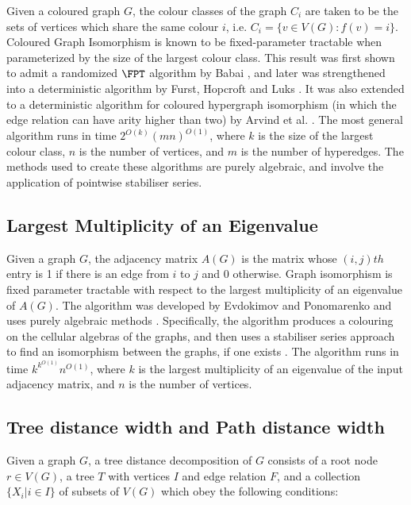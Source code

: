 \documentclass[11pt]{report}
\begin{document}
Given a coloured graph $G$, the colour classes of the graph $C_i$ are taken to be the sets of vertices which share the same colour $i$, i.e. $C_i = \{v\in V(G): f(v)=i\}$. Coloured Graph Isomorphism is known to be fixed-parameter tractable when parameterized by the size of the largest colour class. This result was first shown to admit a randomized $\FPT$ algorithm by Babai \cite{Babai79}, and later was strengthened into a deterministic algorithm by Furst, Hopcroft and Luks \cite{FurstHopcroftLuks80}. It was also extended to a deterministic algorithm for coloured hypergraph isomorphism (in which the edge relation can have arity higher than two) by Arvind et al. \cite{Arvind2009}. The most general algorithm runs in time $2^{O(k)}(mn)^{O(1)}$, where $k$ is the size of the largest colour class, $n$ is the number of vertices, and $m$ is the number of hyperedges. The methods used to create these algorithms are purely algebraic, and involve the application of pointwise stabiliser series.




\subsection{Largest Multiplicity of an Eigenvalue}

Given a graph $G$, the adjacency matrix $A(G)$ is the matrix whose $(i,j)th$ entry is 1 if there is an edge from $i$ to $j$ and 0 otherwise. Graph isomorphism is fixed parameter tractable with respect to the largest multiplicity of an eigenvalue of $A(G)$. The algorithm was developed by Evdokimov and Ponomarenko and uses purely algebraic methods \cite{Evdokimov99}. Specifically, the algorithm produces a colouring on the cellular algebras of the graphs, and then uses a stabiliser series approach to find an isomorphism between the graphs, if one exists \cite{Evdokimov99}. The algorithm runs in time $k^{k^{O(1)}}n^{O(1)}$, where $k$ is the largest multiplicity of an eigenvalue of the input adjacency matrix, and $n$ is the number of vertices.




\subsection{Tree distance width and Path distance width}

Given a graph $G$, a tree distance decomposition of $G$ consists of a root node $r\in V(G)$, a tree $T$ with vertices $I$ and edge relation $F$, and a collection $\{ X_i | i \in I\}$ of subsets of $V(G)$ which obey the following conditions:
\end{document}
